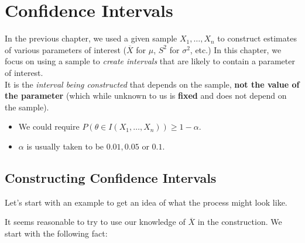\chapter{Confidence Intervals}

In the previous chapter, we used a given sample $X_1, \ldots, X_n$ to construct estimates of various parameters of interest ($\overline{X}$ for $\mu$, $S^2$ for $\sigma^2$, etc.) In this chapter, we focus on using a sample to \textit{create intervals} that are likely to contain a parameter of interest.\\

\note It is the \textit{interval being constructed} that depends on the sample, \textbf{not the value of the parameter} (which while unknown to us is \textbf{fixed} and does not depend on the sample).


\note
\begin{itemize}
    \item We could require $P(\theta \in I(X_1, \ldots, X_n)) \geq 1-\alpha$.
    \item $\alpha$ is usually taken to be $0.01, 0.05$ or $0.1$.
\end{itemize}

\section{Constructing Confidence Intervals}

Let's start with an example to get an idea of what the process might look like. 


It seems reasonable to try to use our knowledge of $\overline{X}$ in the construction. We start with the following fact:\\

